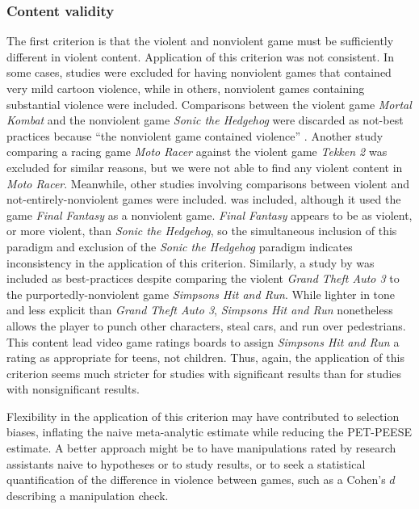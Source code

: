 \documentclass[man]{apa6}
\begin{document}
\subsubsection{Content validity}
The first criterion is that the violent and nonviolent game must be sufficiently different in violent content. Application of this criterion was not consistent. In some cases, studies were excluded for having nonviolent games that contained very mild cartoon violence, while in others, nonviolent games containing substantial violence were included. Comparisons between the violent game {\em Mortal Kombat} and the nonviolent game {\em Sonic the Hedgehog} were discarded as not-best practices \citep[e.g.,][]{Cohn:1995; Hoffman:1994} because ``the nonviolent game contained violence'' \citep[supplementary materials]{Anderson:etal:2010}. Another study comparing a racing game {\em Moto Racer} against the violent game {\em Tekken 2} \citep{Brooks:2000} was excluded for similar reasons, but we were not able to find any violent content in {\em Moto Racer}. Meanwhile, other studies involving comparisons between violent and not-entirely-nonviolent games were included. \citet{Konijn:etal:2007} was included, although it used the game {\em Final Fantasy} as a nonviolent game. {\em Final Fantasy} appears to be as violent, or more violent, than {\em Sonic the Hedgehog}, so the simultaneous inclusion of this paradigm and exclusion of the {\em Sonic the Hedgehog} paradigm indicates inconsistency in the application of this criterion. Similarly, a study by \citet{Brady:Mathews:2006} was included as best-practices despite comparing the violent {\em Grand Theft Auto 3} to the purportedly-nonviolent game {\em Simpsons Hit and Run}. While lighter in tone and less explicit than {\em Grand Theft Auto 3}, {\em Simpsons Hit and Run} nonetheless allows the player to punch other characters, steal cars, and run over pedestrians. This content lead video game ratings boards to assign {\em Simpsons Hit and Run} a rating as appropriate for teens, not children. Thus, again, the application of this criterion seems much stricter for studies with significant results than for studies with nonsignificant results.

Flexibility in the application of this criterion may have contributed to selection biases, inflating the naive meta-analytic estimate while reducing the PET-PEESE estimate. A better approach might be to have manipulations rated by research assistants naive to hypotheses or to study results, or to seek a statistical quantification of the difference in violence between games, such as a Cohen's $d$ describing a manipulation check.
\end{document}

